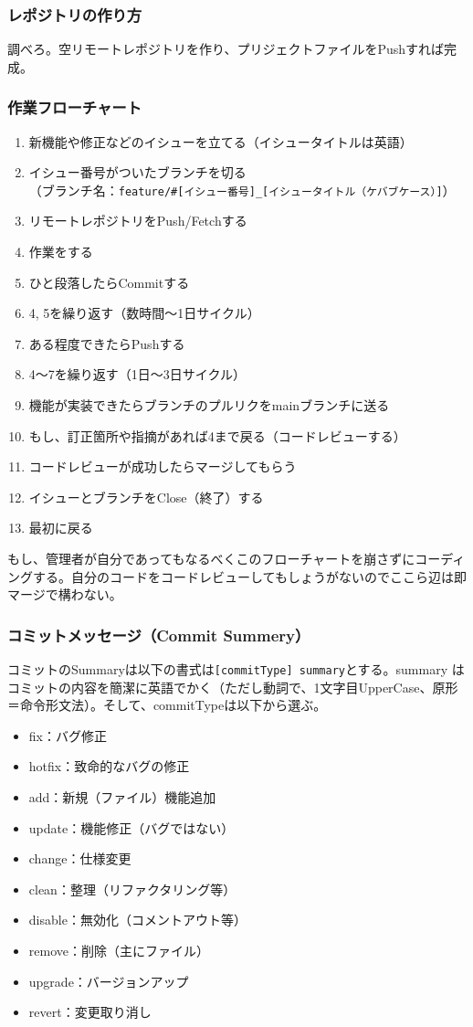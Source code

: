 \documentclass[dvipdfmx,jb5]{jarticle}
\begin{document}
\subsubsection{レポジトリの作り方}
調べろ。空リモートレポジトリを作り、プリジェクトファイルをPushすれば完成。
\subsubsection{作業フローチャート}
 \begin{enumerate}
 \item 新機能や修正などのイシューを立てる（イシュータイトルは英語）
 \item イシュー番号がついたブランチを切る\\
 （ブランチ名：\verb|feature/#[イシュー番号]_[イシュータイトル（ケバブケース）]|）
 \item リモートレポジトリをPush/Fetchする
 \item 作業をする
 \item ひと段落したらCommitする
 \item 4, 5を繰り返す（数時間〜1日サイクル）
 \item ある程度できたらPushする
 \item 4〜7を繰り返す（1日〜3日サイクル）
 \item 機能が実装できたらブランチのプルリクをmainブランチに送る
 \item もし、訂正箇所や指摘があれば4まで戻る（コードレビューする）
 \item コードレビューが成功したらマージしてもらう
 \item イシューとブランチをClose（終了）する
 \item 最初に戻る
 \end{enumerate}
 もし、管理者が自分であってもなるべくこのフローチャートを崩さずにコーディングする。自分のコードをコードレビューしてもしょうがないのでここら辺は即マージで構わない。
 \subsubsection{コミットメッセージ（Commit Summery）}
 コミットのSummaryは以下の書式は\verb|[commitType] summary|とする。summary はコミットの内容を簡潔に英語でかく（ただし動詞で、1文字目UpperCase、原形＝命令形文法）。そして、commitTypeは以下から選ぶ。

\begin{itemize}
\item fix：バグ修正　
\item hotfix：致命的なバグの修正
\item add：新規（ファイル）機能追加
\item update：機能修正（バグではない）
\item change：仕様変更
\item clean：整理（リファクタリング等）
\item disable：無効化（コメントアウト等）
\item remove：削除（主にファイル）
\item upgrade：バージョンアップ
\item revert：変更取り消し
\end{itemize}
\end{document}
